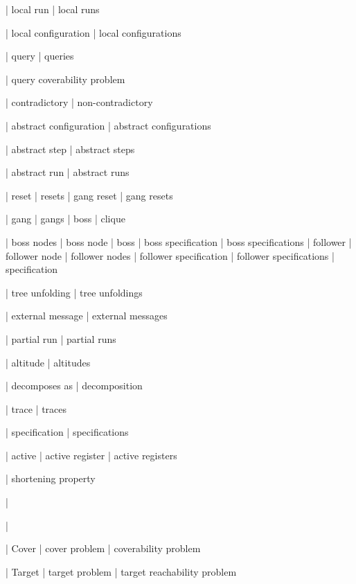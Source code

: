 | local run
| local runs

| local configuration
| local configurations

| query
| queries

| query coverability problem

| contradictory
| non-contradictory

| abstract configuration
| abstract configurations

| abstract step
| abstract steps


| abstract run
| abstract runs

| reset
| resets
| gang reset
| gang resets



| gang
| gangs
| boss
| clique


| boss nodes
| boss node
| boss
| boss specification
| boss specifications
| follower
| follower node
| follower nodes
| follower specification
| follower specifications
| specification

| tree unfolding
| tree unfoldings

| external message
| external messages

| partial run
| partial runs

| altitude
| altitudes

| decomposes as
| decomposition

| trace
| traces

| specification
| specifications


| active
| active register
| active registers

| shortening property

| \memoryproj

| \memoryproj


| Cover
| cover problem
| coverability problem

| Target
| target problem
| target reachability problem